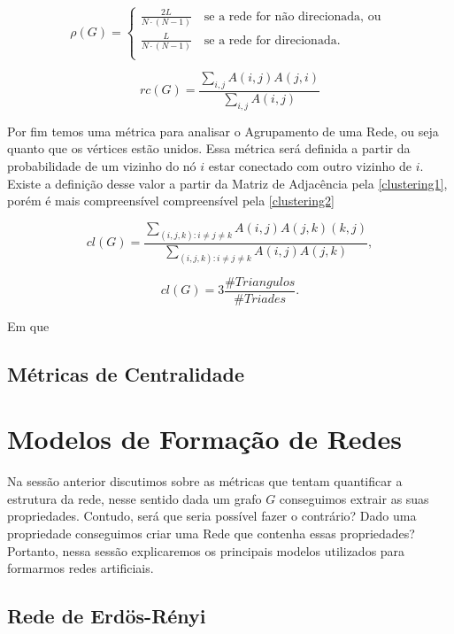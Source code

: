 \documentclass[12pt]{abnt-fisica11}%
\begin{document}
\[   
  \rho(G) = 
     \begin{cases}
      \frac{2L}{N\cdot(N-1)} \quad \text{se a rede for não direcionada, ou }\\
      \frac{L}{N\cdot(N-1)} \quad \text{se a rede for direcionada.} \\
     \end{cases}
\]

\begin{equation}
  rc(G) = \frac{\sum_{i,j} A(i,j)A(j,i)}{\sum_{i,j} A(i,j)}
\end{equation}

Por fim temos uma métrica para analisar o Agrupamento de uma Rede, ou seja quanto que os vértices estão unidos. Essa métrica será definida a partir da probabilidade de um vizinho do nó $i$ estar conectado com outro vizinho de $i$. Existe a definição desse valor a partir da Matriz de Adjacência pela \ref{clustering1}, porém é mais compreensível compreensível pela \ref{clustering2}

\begin{equation}
  cl(G) = \frac{\sum_{(i,j,k): i\neq j \neq k}A(i,j)A(j,k)(k,j)}{\sum_{(i,j,k): i\neq j \neq k}A(i,j)A(j,k)},
  \label{clustering1}
\end{equation}

\begin{equation}
  cl(G) = 3\frac{\#Triangulos}{\#Triades}.
  \label{clustering2}
\end{equation}

Em que 

\subsection{Métricas de Centralidade}

\section{Modelos de Formação de Redes}

Na sessão anterior discutimos sobre as métricas que tentam quantificar a estrutura da rede, nesse sentido dada um grafo $G$ conseguimos extrair as suas propriedades. Contudo, será que seria possível fazer o contrário? Dado uma propriedade conseguimos criar uma Rede que contenha essas propriedades? Portanto, nessa sessão explicaremos os principais modelos utilizados para formarmos redes artificiais.

\subsection{Rede de Erdös-Rényi}
\end{document}
